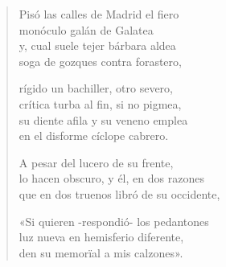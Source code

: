 \begin{verse}
 Pisó las calles de Madrid el fiero \\
 monóculo galán de Galatea\\
y, cual suele tejer bárbara aldea\\
 soga de gozques contra forastero,
 
 rígido un bachiller, otro severo,\\
crítica turba al fin, si no pigmea,\\
 su diente afila y su veneno emplea\\
en el disforme cíclope cabrero.
 
A pesar del lucero de su frente,\\
lo hacen obscuro, y él, en dos razones\\
que en dos truenos libró de su occidente,
 
«Si quieren -respondió- los pedantones\\
luz nueva en hemisferio diferente,\\
den su memorïal a mis calzones».


\end{verse}
